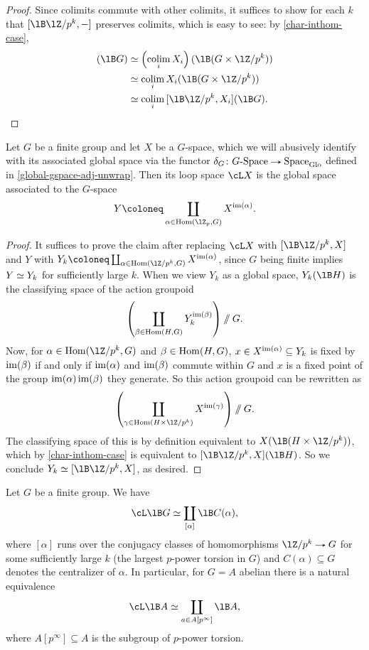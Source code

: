 \begin{proof}
  Since colimits commute with other colimits, it suffices to show for
  each $k$ that $[\lB\lZ/p^k, -]$ preserves colimits, which is easy to
  see: by \cref{char-inthom-case},
  \begin{align*}
  [\lB\lZ/p^k, \colim_i X_i](\lB G) &\iso
  \l(\colim_i X_i\r)(\lB(G \times \lZ/p^k)) \\ &\iso
  \colim_i X_i(\lB(G \times \lZ/p^k)) \\&\iso
  \colim_i {[\lB\lZ/p^k, X_i](\lB G)}. \qedhere
  \end{align*}
\end{proof}

\begin{lemma}
  \label{char-loop-gspace}
  Let $G$ be a finite group and let $X$ be a $G$-space, which we will
  abusively identify with its associated global space via the functor
  $\delta_G \c G\dash\Space \to \Space_\Glo$ defined in
  \cref{global-gspace-adj-unwrap}. Then its loop space $\cL X$ is the
  global space associated to the $G$-space
  \[
  Y \ce \coprod_{\alpha \in \Hom(\lZ_p,G)} X^{\im(\alpha)}.
  \]
\end{lemma}

\begin{proof}
  It suffices to prove the claim after replacing $\cL X$ with
  $[\lB\lZ/p^k, X]$ and $Y$ with
  $Y_k \ce \coprod_{\alpha \in \Hom(\lZ/p^k,G)} X^{\im(\alpha)}$,
  since $G$ being finite implies $Y \simeq Y_k$ for sufficiently large
  $k$. When we view $Y_k$ as a global space, $Y_k(\lB H)$ is the
  classifying space of the action groupoid
  \[
  \left( \coprod_{\beta \in \operatorname{Hom}(H,G)} Y_k^{\operatorname{im}(\beta)} \right) \sslash G.
  \]
  Now, for $\alpha \in \Hom(\lZ/p^k, G)$ and $\beta \in \operatorname{Hom}(H,G)$,
  $x \in X^{\operatorname{im}(\alpha)} \subseteq Y_k$ is fixed by $\operatorname{im}(\beta)$ if
  and only if $\operatorname{im}(\alpha)$ and $\operatorname{im}(\beta)$ commute within $G$ and
  $x$ is a fixed point of the group $\operatorname{im}(\alpha)\operatorname{im}(\beta)$ they
  generate. So this action groupoid can be rewritten as
  \[
  \l(\coprod_{\gamma \in \Hom(H \times \lZ/p^k)} X^{\im(\gamma)}\r)
  \sslash G.
  \]
  The classifying space of this is by definition equivalent to
  $X(\lB(H \times \lZ/p^k))$, which by \cref{char-inthom-case} is
  equivalent to $[\lB\lZ/p^k, X](\lB H)$. So we conclude
  $Y_k \iso [\lB\lZ/p^k, X]$, as desired.
\end{proof}

\begin{lemma}
  \label{char-loop-bg}
  Let $G$ be a finite group. We have
  \[
  \cL \lB G \iso \coprod_{[\alpha]} \lB C(\alpha),
  \]
  where $[\alpha]$ runs over the conjugacy classes of homomorphisms
  $\lZ/p^k \to G$ for some sufficiently large $k$ (the largest
  $p$-power torsion in $G$) and $C(\alpha) \subseteq G$ denotes the
  centralizer of $\alpha$. In particular, for $G = A$ abelian there is
  a natural equivalence
  \[
  \cL \lB A \iso \coprod_{a \in A[p^\infty]} \lB A,
  \]
  where $A[p^\infty] \subseteq A$ is the subgroup of $p$-power
  torsion.
\end{lemma}

